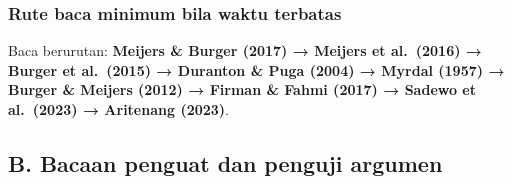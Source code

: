 \documentclass[
  indonesian,
  11pt,
  a4paper,
  oneside,
  openany]{report}
\begin{document}
\subsubsection{Rute baca minimum bila waktu
terbatas}\label{rute-baca-minimum-bila-waktu-terbatas}

Baca berurutan: \textbf{Meijers \& Burger (2017) → Meijers et al.~(2016)
→ Burger et al.~(2015) → Duranton \& Puga (2004) → Myrdal (1957) →
Burger \& Meijers (2012) → Firman \& Fahmi (2017) → Sadewo et al.~(2023)
→ Aritenang (2023)}.

\subsection{B. Bacaan penguat dan penguji
argumen}\label{b.-bacaan-penguat-dan-penguji-argumen}
\end{document}
